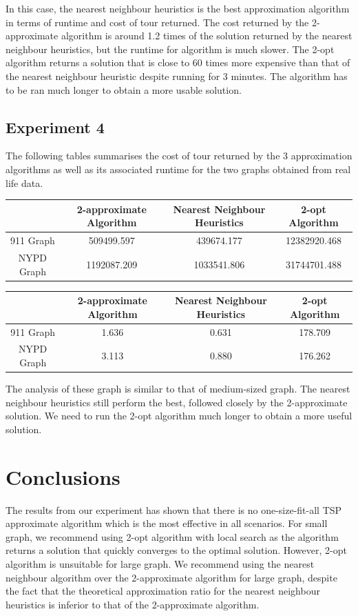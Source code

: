 \documentclass[paper=a4, fontsize=11pt]{scrartcl}	%
\numberwithin{equation}{section}		%
\numberwithin{figure}{section}			%
\numberwithin{table}{section}				%
\begin{document}
In this case, the nearest neighbour heuristics is the best approximation algorithm in terms of runtime and cost of tour returned. The cost returned by the 2-approximate algorithm is around 1.2 times of the solution returned by the nearest neighbour heuristics, but the runtime for algorithm is much slower. The 2-opt algorithm returns a solution that is close to 60 times more expensive than that of the nearest neighbour heuristic despite running for 3 minutes. The algorithm has to be ran much longer to obtain a more usable solution.

\subsection{Experiment 4}
The following tables summarises the cost of tour returned by the 3 approximation algorithms as well as its associated runtime for the two graphs obtained from real life data.

\begin{center}
\begin{tabular}{|c|c|c|c|}
\hline 
 & 2-approximate Algorithm & Nearest Neighbour Heuristics & 2-opt Algorithm \\ 
\hline 
911 Graph & 509499.597 & 439674.177 & 12382920.468 \\ 
\hline 
NYPD Graph & 1192087.209 & 1033541.806 & 31744701.488 \\ 
\hline 
\end{tabular} 
\end{center}

\begin{center}
\begin{tabular}{|c|c|c|c|}
\hline 
 & 2-approximate Algorithm & Nearest Neighbour Heuristics & 2-opt Algorithm \\ 
\hline 
911 Graph & 1.636 & 0.631 & 178.709 \\ 
\hline 
NYPD Graph & 3.113 & 0.880 & 176.262 \\ 
\hline 
\end{tabular} 
\end{center}

The analysis of these graph is similar to that of medium-sized graph. The nearest neighbour heuristics still perform the best, followed closely by the 2-approximate solution. We need to run the 2-opt algorithm much longer to obtain a more useful solution.
\section{Conclusions}
The results from our experiment has shown that there is no one-size-fit-all TSP approximate algorithm which is the most effective in all scenarios. For small graph, we recommend using 2-opt algorithm with local search as the algorithm returns a solution that quickly converges to the optimal solution. However, 2-opt algorithm is unsuitable for large graph. We recommend using the nearest neighbour algorithm over the 2-approximate algorithm for large graph, despite the fact that the theoretical approximation ratio for the nearest neighbour heuristics is inferior to that of the 2-approximate algorithm. 
\end{document}
